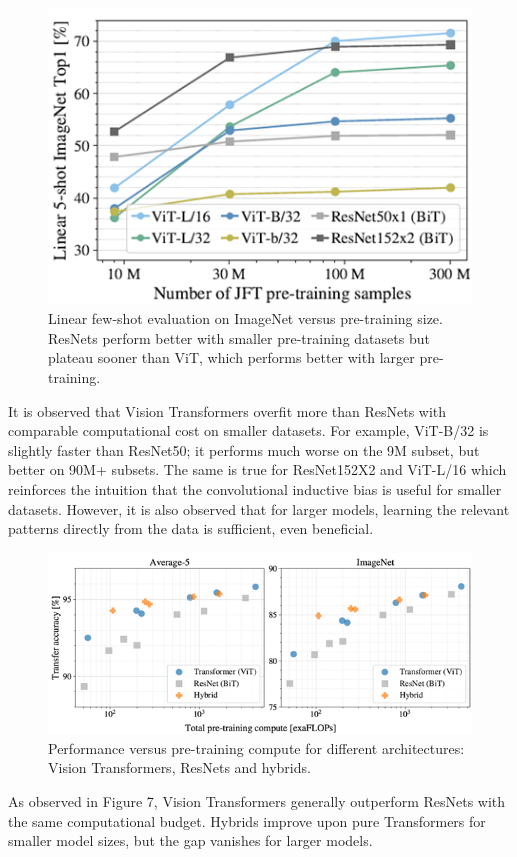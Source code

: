 \documentclass[conference]{IEEEtran}
\begin{document}
\begin{figure}[htbp]
\centerline{\includegraphics[width=1\linewidth]{linear_5_shot_accuracy.png}}
\caption{Linear few-shot evaluation on ImageNet versus pre-training size. ResNets perform better with smaller pre-training datasets but plateau sooner than ViT, which performs better with larger pre-training.}

\end{figure}

It is observed that Vision Transformers overfit more than ResNets with comparable computational cost on smaller datasets. For example, ViT-B/32 is slightly faster than ResNet50; it performs much worse on the 9M subset, but better on 90M+ subsets. The same is true for ResNet152X2 and ViT-L/16 which reinforces the intuition that the convolutional inductive bias is useful for smaller datasets.
However, it is also observed that for larger models, learning the relevant patterns directly from the data is sufficient, even beneficial.


\begin{figure}[htbp]
\centerline{\includegraphics[width=1\linewidth]{transfer_accuracy_exaflops.png}}
\caption{Performance versus pre-training compute for different architectures: Vision Transformers, ResNets and hybrids.}

\end{figure}
As observed in Figure 7, Vision Transformers generally outperform ResNets with the same computational budget. Hybrids improve upon pure Transformers for smaller model sizes, but the gap vanishes for larger models.
\end{document}
